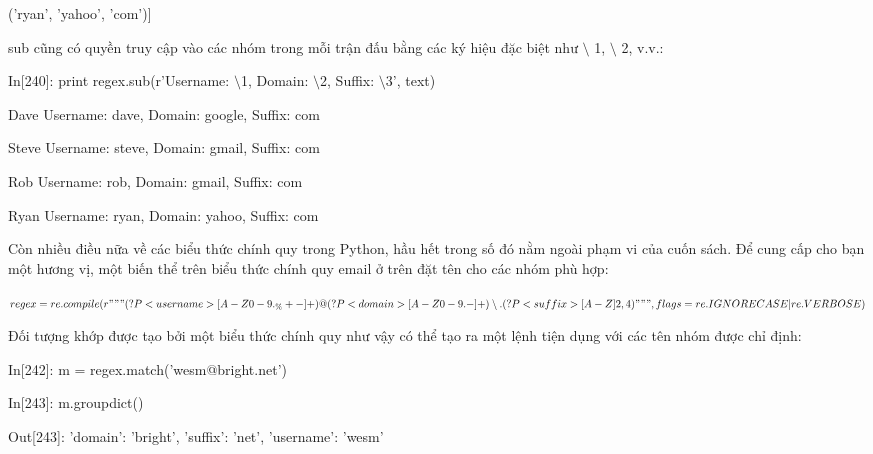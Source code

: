 \hspace{1cm} ('ryan', 'yahoo', 'com')]\par
 sub cũng có quyền truy cập vào các nhóm trong mỗi trận đấu bằng các ký hiệu đặc biệt như $\setminus$ 1, $\setminus$ 2, v.v.:\par
\hspace{1cm}In\hspace{3mm}[240]:\hspace{3mm} print regex.sub(r'Username: $\setminus$1, Domain: $\setminus$2, Suffix: $\setminus$3', text)\par
\hspace{1cm}Dave Username: dave, Domain: google, Suffix: com\par
\hspace{1cm}Steve Username: steve, Domain: gmail, Suffix: com\par
\hspace{1cm}Rob Username: rob, Domain: gmail, Suffix: com\par
\hspace{1cm}Ryan Username: ryan, Domain: yahoo, Suffix: com \par
Còn nhiều điều nữa về các biểu thức chính quy trong Python, hầu hết trong số đó nằm ngoài phạm vi của cuốn sách. Để cung cấp cho bạn một hương vị, một biến thể trên biểu thức chính quy email ở trên đặt tên cho các nhóm phù hợp:\par
$regex = re.compile(r"""(?P<username>[A-Z0-9._ \%+-]+)@(?P<domain>[A-Z0-9.-]+)\setminus .(?P<suffix>[A-Z]{2,4})""", flags=re.IGNORECASE|re.VERBOSE)$ \par
 Đối tượng khớp được tạo bởi một biểu thức chính quy như vậy có thể tạo ra một lệnh tiện dụng với các tên nhóm được chỉ định:\par
\hspace{1cm}In\hspace{3mm}[242]:\hspace{3mm} m = regex.match('wesm@bright.net')\par
\hspace{1cm}In\hspace{3mm}[243]:\hspace{3mm} m.groupdict()\par
\hspace{1cm}Out[243]:\hspace{3mm} {'domain': 'bright', 'suffix': 'net', 'username': 'wesm'} \par
